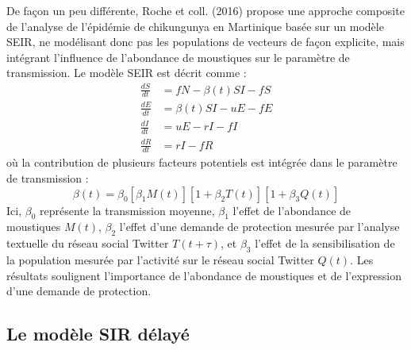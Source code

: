 De façon un peu différente, Roche et coll. (2016) propose une approche composite de l'analyse de l'épidémie de chikungunya en Martinique basée sur un modèle SEIR, ne modélisant donc pas les populations de vecteurs de façon explicite, mais intégrant l'influence de l'abondance de moustiques sur le paramètre de transmission.
Le modèle SEIR est décrit comme :
\begin{align}
\label{eq:rocheseri}
\frac{dS}{dt} &= fN - \beta(t)SI - fS \\ \nonumber
\frac{dE}{dt} &= \beta(t)SI - uE - fE \\ \nonumber
\frac{dI}{dt} &= uE - rI - fI \\ \nonumber
\frac{dR}{dt} &= rI - fR
\end{align}
où la contribution de plusieurs facteurs potentiels est intégrée dans le paramètre de transmission :
\begin{equation}
\beta(t) = \beta_0 \left[ \beta_1 M(t)\right]\left[1 + \beta_2 T(t)\right]\left[1 + \beta_3 Q(t)\right]
\end{equation}
Ici, $\beta_0$ représente la transmission moyenne, $\beta_1$ l'effet de l'abondance de moustiques $M(t)$, $\beta_2$ l'effet d'une demande de protection mesurée par l'analyse textuelle du réseau social Twitter $T(t+\tau)$, et $\beta_3$ l'effet de la sensibilisation de la population mesurée par l'activité sur le réseau social Twitter $Q(t)$.
Les résultats soulignent l'importance de l'abondance de moustiques et de l'expression d'une demande de protection.


\subsection{Le modèle SIR délayé}

